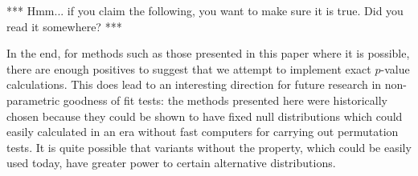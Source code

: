

*** Hmm... if you claim the following, you want to make sure it is true.
Did you read it somewhere? ***

In the end, for methods such as those presented in this paper where it is possible,
there are enough positives to suggest that we attempt to implement exact $p$-value calculations. This does lead
to an interesting direction for future research in non-parametric goodness of fit tests: the methods presented
here were historically chosen because they could be shown to have fixed null distributions which could easily
calculated in an era without fast computers for carrying out permutation tests. It is quite possible that
variants without the property, which could be easily used today, have greater power to certain alternative 
distributions.

